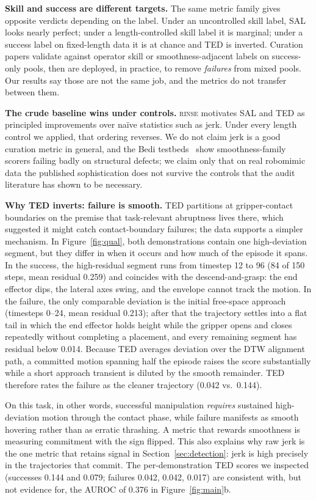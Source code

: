\documentclass[10pt]{article}
\newcommand{\rinse}{\textsc{rinse}}
\begin{document}
\textbf{Skill and success are different targets.} The same metric family
gives opposite verdicts depending on the label. Under an uncontrolled skill
label, SAL looks nearly perfect; under a length-controlled skill label it is
marginal; under a success label on fixed-length data it is at chance and TED
is inverted. Curation papers validate against operator skill or
smoothness-adjacent labels on success-only pools, then are deployed, in
practice, to remove \emph{failures} from mixed pools. Our results say those
are not the same job, and the metrics do not transfer between them.

\textbf{The crude baseline wins under controls.} \rinse{} motivates SAL and
TED as principled improvements over na\"ive statistics such as jerk. Under
every length control we applied, that ordering reverses. We do not claim
jerk is a good curation metric in general, and the Bedi
testbeds~\citep{bedi-audit} show smoothness-family scorers failing badly on
structural defects; we claim only that on real robomimic data the published
sophistication does not survive the controls that the audit literature has
shown to be necessary.

\textbf{Why TED inverts: failure is smooth.} TED partitions at
gripper-contact boundaries on the premise that task-relevant abruptness
lives there, which suggested it might catch contact-boundary failures; the
data supports a simpler mechanism. In Figure~\ref{fig:qual}, both
demonstrations contain one high-deviation segment, but they differ in
when it occurs and how much of the episode it spans. In the success, the
high-residual segment runs from timestep 12 to 96 (84 of 150 steps, mean
residual 0.259) and coincides with the descend-and-grasp: the end effector
dips, the lateral axes swing, and the envelope cannot track the motion. In
the failure, the only comparable deviation is the initial free-space
approach (timesteps 0--24, mean residual 0.213); after that the trajectory
settles into a flat tail in which the end effector holds height while the
gripper opens and closes repeatedly without completing a placement, and
every remaining segment has residual below 0.014. Because TED averages
deviation over the DTW alignment path, a committed motion spanning half the
episode raises the score substantially while a short approach transient is
diluted by the smooth remainder. TED therefore rates the failure as the
cleaner trajectory (0.042 vs.\ 0.144).

On this task, in other words, successful manipulation \emph{requires}
sustained high-deviation motion through the contact phase, while failure
manifests as smooth hovering rather than as erratic thrashing. A metric that
rewards smoothness is measuring commitment with the sign flipped. This also
explains why raw jerk is the one metric that retains signal in
Section~\ref{sec:detection}: jerk is high precisely in the trajectories that
commit. The per-demonstration TED scores we inspected (successes 0.144 and
0.079; failures 0.042, 0.042, 0.017) are consistent with, but not evidence
for, the AUROC of 0.376 in Figure~\ref{fig:main}b.
\end{document}
